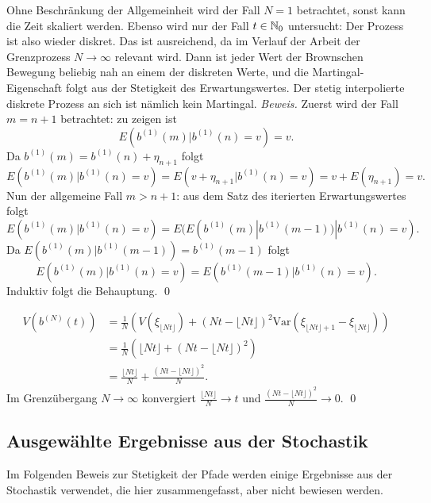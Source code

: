 \begin{lemma}
Ohne Beschränkung der Allgemeinheit wird der Fall $N=1$ betrachtet, sonst kann die Zeit skaliert werden.
Ebenso wird nur der Fall $t \in \Bbb N_0$ untersucht: Der Prozess ist also wieder diskret. Das ist
ausreichend, da im Verlauf der Arbeit der Grenzprozess $N \to \infty$ relevant 
wird. Dann ist jeder Wert der Brownschen Bewegung beliebig nah an einem der diskreten Werte, 
und die Martingal-Eigenschaft folgt aus der Stetigkeit des Erwartungswertes. Der stetig interpolierte 
diskrete Prozess an sich ist nämlich kein Martingal. \textit{Beweis.}
Zuerst wird der Fall $m=n+1$ betrachtet: zu zeigen ist
$$E(b^{(1)}(m) | b^{(1)}(n)=v) = v.$$
Da $b^{(1)}(m) = b^{(1)}(n) + \eta_{n+1}$ folgt
$$E(b^{(1)}(m) | b^{(1)}(n)=v) = E(v + \eta_{n+1} | b^{(1)}(n)=v) = v + E(\eta_{n+1}) = v.$$
Nun der allgemeine Fall $m > n+1$: aus dem Satz des iterierten Erwartungswertes folgt
$$E(b^{(1)}(m) | b^{(1)}(n)=v) = E(E(b^{(1)}(m) | b^{(1)}(m-1)) | b^{(1)}(n)=v).$$
Da $E(b^{(1)}(m) | b^{(1)}(m-1)) = b^{(1)}(m-1)$ folgt
$$E(b^{(1)}(m) | b^{(1)}(n)=v) = E(b^{(1)}(m-1) | b^{(1)}(n)=v).$$
Induktiv folgt die Behauptung. \qed \\

\end{lemma}

\begin{lemma}
$$
\begin{aligned}
V(b^{(N)}(t)) &= \frac{1}{N} \left ( V(\xi_{\lfloor Nt \rfloor}) + (Nt - \lfloor Nt \rfloor)^2 \text{Var}(\xi_{\lfloor Nt \rfloor + 1} - \xi_{\lfloor Nt \rfloor}) \right ) 
\\ &= \frac{1}{N} (\lfloor Nt \rfloor + (Nt - \lfloor Nt \rfloor)^2)  
\\ &= \frac{\lfloor Nt \rfloor}{N} + \frac{(Nt - \lfloor Nt \rfloor)^2}{N}.
\end{aligned}
$$
Im Grenzübergang $N \to \infty$ konvergiert $\frac{\lfloor Nt \rfloor}{N} \to t$ und $\frac{(Nt - \lfloor Nt \rfloor)^2}{N} \to 0$.
\qed
\end{lemma}

\subsection{Ausgewählte Ergebnisse aus der Stochastik}
Im Folgenden Beweis zur Stetigkeit der Pfade werden einige Ergebnisse aus der Stochastik verwendet, die hier zusammengefasst, aber nicht bewiesen werden.


